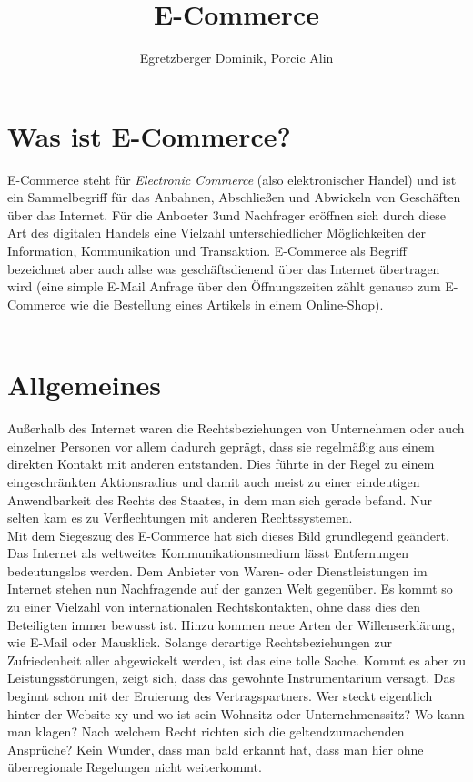 \documentclass[a4paper]{article}
\author{Egretzberger Dominik, Porcic Alin}
\title{E-Commerce}
\begin{document}
 

\maketitle
\newpage

\tableofcontents
\newpage

\section{Was ist E-Commerce?}

E-Commerce steht für \textit{Electronic Commerce} (also elektronischer Handel) und ist ein Sammelbegriff für das Anbahnen, Abschließen und Abwickeln von Geschäften über das Internet. Für die Anboeter 3und Nachfrager eröffnen sich durch diese Art des digitalen Handels eine Vielzahl unterschiedlicher Möglichkeiten der Information, Kommunikation und Transaktion. E-Commerce als Begriff bezeichnet aber auch allse was geschäftsdienend über das Internet übertragen wird (eine simple E-Mail Anfrage über den Öffnungszeiten zählt genauso zum E-Commerce wie die Bestellung eines Artikels in einem Online-Shop).\\\\

\section{Allgemeines}

Außerhalb des Internet waren die Rechtsbeziehungen von Unternehmen oder auch einzelner Personen vor allem dadurch geprägt, dass sie regelmäßig aus einem direkten Kontakt mit anderen entstanden. Dies führte in der Regel zu einem eingeschränkten Aktionsradius und damit auch meist zu einer eindeutigen Anwendbarkeit des Rechts des Staates, in dem man sich gerade befand. Nur selten kam es zu Verflechtungen mit anderen Rechtssystemen.\\
Mit dem Siegeszug des E-Commerce hat sich dieses Bild grundlegend geändert. Das Internet als weltweites Kommunikationsmedium lässt Entfernungen bedeutungslos werden. Dem Anbieter von Waren- oder Dienstleistungen im Internet stehen nun Nachfragende auf der ganzen Welt gegenüber. Es kommt so zu einer Vielzahl von internationalen Rechtskontakten, ohne dass dies den Beteiligten immer bewusst ist. Hinzu kommen neue Arten der Willenserklärung, wie E-Mail oder Mausklick. Solange derartige Rechtsbeziehungen zur Zufriedenheit aller abgewickelt werden, ist das eine tolle Sache. Kommt es aber zu Leistungsstörungen, zeigt sich, dass das gewohnte Instrumentarium versagt. Das beginnt schon mit der Eruierung des Vertragspartners. Wer steckt eigentlich hinter der Website xy und wo ist sein Wohnsitz oder Unternehmenssitz? Wo kann man klagen? Nach welchem Recht richten sich die geltendzumachenden Ansprüche? Kein Wunder, dass man bald erkannt hat, dass man hier ohne überregionale Regelungen nicht weiterkommt.
\end{document}
